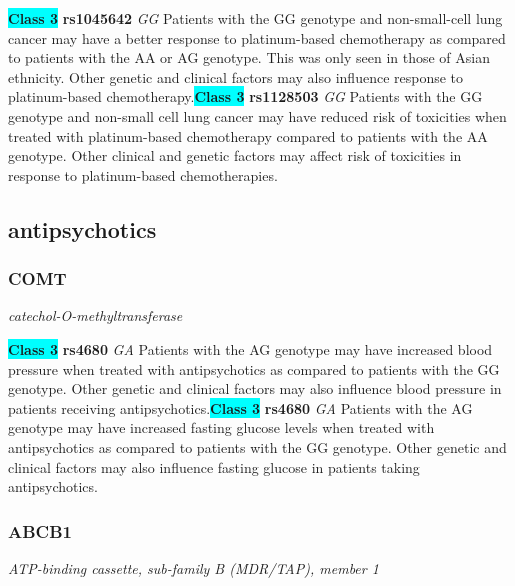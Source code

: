 \documentclass{report}
\begin{document}
\textbf{\colorbox{cyan} {Class 3}} \textbf{ rs1045642 } \textit{ GG }
Patients with the GG genotype and non-small-cell lung cancer may have a better response to platinum-based chemotherapy as compared to patients with the AA or AG genotype. This was only seen in those of Asian ethnicity. Other genetic and clinical factors may also influence response to platinum-based chemotherapy.\newline\textbf{\colorbox{cyan} {Class 3}} \textbf{ rs1128503 } \textit{ GG }
Patients with the GG genotype and non-small cell lung cancer may have reduced risk of toxicities when treated with platinum-based chemotherapy compared to patients with the AA genotype. Other clinical and genetic factors may affect risk of toxicities in response to platinum-based chemotherapies.\newline\subsection{ antipsychotics }\subsubsection{ COMT }
\textit{ catechol-O-methyltransferase }

\textbf{\colorbox{cyan} {Class 3}} \textbf{ rs4680 } \textit{ GA }
Patients with the AG genotype may have increased blood pressure when treated with antipsychotics as compared to patients with the GG genotype. Other genetic and clinical factors may also influence blood pressure in patients receiving antipsychotics.\newline\textbf{\colorbox{cyan} {Class 3}} \textbf{ rs4680 } \textit{ GA }
Patients with the AG genotype may have increased fasting glucose levels when treated with antipsychotics as compared to patients with the GG genotype. Other genetic and clinical factors may also influence fasting glucose in patients taking antipsychotics.\newline\subsubsection{ ABCB1 }
\textit{ ATP-binding cassette, sub-family B (MDR/TAP), member 1 }
\end{document}
